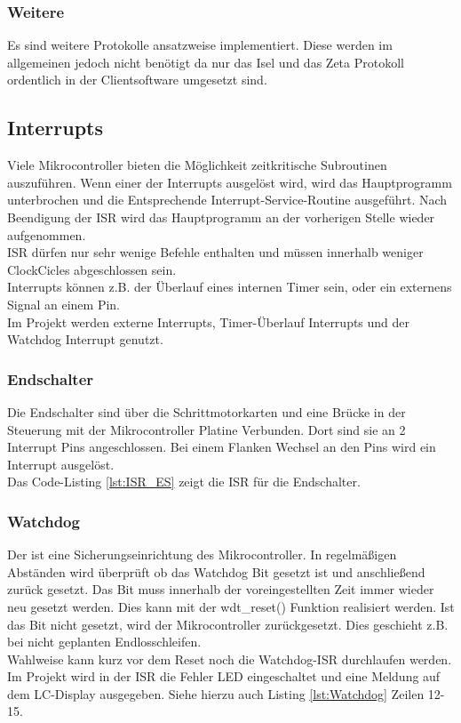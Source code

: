 \subsubsection{Weitere}
Es sind weitere Protokolle ansatzweise implementiert. Diese werden im allgemeinen jedoch nicht benötigt da nur das Isel und das Zeta Protokoll ordentlich in der Clientsoftware umgesetzt sind.


\subsection{Interrupts}
\label{sec:Interrupts}
Viele Mikrocontroller bieten die Möglichkeit zeitkritische Subroutinen auszuführen. Wenn einer der Interrupts ausgelöst wird, wird das Hauptprogramm unterbrochen und die Entsprechende Interrupt-Service-Routine ausgeführt. Nach Beendigung der ISR wird das Hauptprogramm an der vorherigen Stelle wieder aufgenommen.\\
ISR dürfen nur sehr wenige Befehle enthalten und müssen innerhalb weniger ClockCicles abgeschlossen sein. \\
Interrupts können z.B. der Überlauf eines internen Timer sein, oder ein externens Signal an einem Pin.\\
Im Projekt werden externe Interrupts, Timer-Überlauf Interrupts und der Watchdog Interrupt genutzt. 
\subsubsection{Endschalter}
Die Endschalter sind über die Schrittmotorkarten und eine Brücke in der Steuerung mit der Mikrocontroller Platine Verbunden. Dort sind sie an 2 Interrupt Pins angeschlossen.  Bei einem Flanken Wechsel an den Pins wird ein Interrupt ausgelöst. \\
Das Code-Listing \ref{lst:ISR_ES} zeigt die ISR für die Endschalter.
\lstset{language=C, basicstyle=\footnotesize, showstringspaces=false, tabsize=2}

\subsubsection{Watchdog}
Der  ist eine Sicherungseinrichtung des Mikrocontroller. In regelmäßigen Abständen wird überprüft ob das Watchdog Bit gesetzt ist und anschließend zurück gesetzt. Das Bit muss innerhalb der voreingestellten Zeit immer wieder neu gesetzt werden. Dies kann mit der wdt\_reset() Funktion realisiert werden. Ist das Bit nicht gesetzt, wird der Mikrocontroller zurückgesetzt.  Dies geschieht z.B. bei nicht geplanten Endlosschleifen.\\
Wahlweise kann kurz vor dem Reset noch die Watchdog-ISR durchlaufen werden.\\
Im Projekt wird in der ISR die Fehler LED eingeschaltet und eine Meldung auf dem LC-Display ausgegeben. Siehe hierzu auch Listing \ref{lst:Watchdog} Zeilen 12-15.
\lstset{language=C, basicstyle=\footnotesize, showstringspaces=false, tabsize=4}




